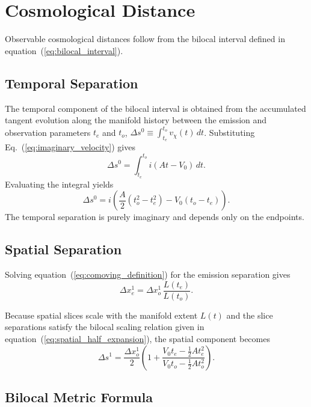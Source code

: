 \documentclass[fontsize=12pt, paper=a4]{scrartcl}
\begin{document}
\section{Cosmological Distance}

Observable cosmological distances follow from the bilocal interval defined in equation~(\ref{eq:bilocal_interval}). 

\subsection{Temporal Separation}

The temporal component of the bilocal interval is obtained from the accumulated tangent evolution along the manifold history between the emission and observation parameters $t_e$ and $t_o$, $\Delta s^0 \equiv \int_{t_e}^{t_o} v_\chi(t)\,dt$. Substituting Eq.~(\ref{eq:imaginary_velocity}) gives
\begin{equation}
\Delta s^0 = \int_{t_e}^{t_o} i\left(A t - V_0\right)\,dt .
\end{equation}
Evaluating the integral yields
\begin{equation}
\Delta s^0 = i\left(\frac{A}{2}\left(t_o^2 - t_e^2\right) - V_0\left(t_o - t_e\right)\right) .
\end{equation}
The temporal separation is purely imaginary and depends only on the endpoints.

\subsection{Spatial Separation}

Solving equation~(\ref{eq:comoving_definition}) for the emission separation gives
\begin{equation}
\Delta x_e^1 = \Delta x_o^1\,\frac{L(t_e)}{L(t_o)} .
\end{equation}

Because spatial slices scale with the manifold extent $L(t)$ and the slice separations satisfy the bilocal scaling relation given in equation~(\ref{eq:spatial_half_expansion}), the spatial component becomes
\begin{equation}
\Delta s^1 =\frac{\Delta x_o^1}{2}\left(1 +\frac{V_0 t_e - \frac{1}{2} A t_e^2}{V_0 t_o - \frac{1}{2} A t_o^2}\right).
\label{eq:bilocal_spatial}
\end{equation}

\subsection{Bilocal Metric Formula}
\end{document}
